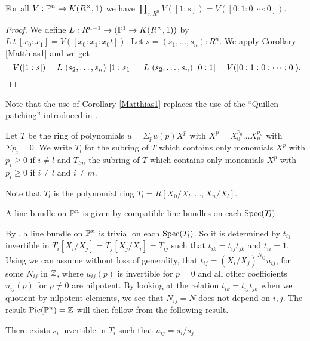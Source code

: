 \begin{proposition}\label{trivial}
  For all $V:\mathbb{P}^n\rightarrow K(R^{\times},1)$ we have ${\prod_{s:R^n}V([1:s]) = V([0:1:0:\cdots :0])}$.
\end{proposition}

\begin{proof}
  We define $L:R^{n-1}\rightarrow (\mathbb{P}^1 \to K(R^{\times},1))$ by $L~t~[x_0:x_1] = V([x_0:x_1:x_0t])$.
  Let $s=(s_1,\dots,s_{n}):R^{n}$. We apply Corollary \ref{Matthias1} and we get
  \[
   V([1:s]) = L~(s_2,\dots,s_n)~[1:s_1] = L~(s_2,\dots,s_n)~[0:1] = V([0:1:0:\cdots :0])
   \rlap{.}
  \]
\end{proof}

 Note that the use of Corollary \ref{Matthias1} replaces the use of the ``Quillen patching''
 \cite{lombardi-quitte} introduced in \cite{Quillen}.

\medskip

Let $T$ be the ring of polynomials $u = \Sigma_p u(p)X^p$ with
$X^p = X_0^{p_0}\dots X_n^{p_n}$ with $\Sigma p_i = 0$. We write $T_l$ for the subring
of $T$ which contains only monomials $X^p$ with $p_i\geqslant 0$ if $i\neq l$
and $T_{lm}$ the subring of $T$ 
which contains only monomials $X^p$ with $p_i\geqslant 0$ if $i\neq l$ and $i\neq m$.

Note that $T_l$ is the polynomial ring $T_l = R[X_0/X_l,\dots,X_n/X_l]$.

A line bundle on $\mathbb{P}^n$ is given by compatible line bundles on each $\operatorname{Spec}(T_l)$.

By , a line bundle on $\mathbb{P}^n$ is trivial on each $\operatorname{Spec}(T_l)$.
So it is determined by $t_{ij}$ invertible in $T_i[X_i/X_j] = T_j[X_j/X_i] = T_{ij}$
such that $t_{ik} = t_{ij}t_{jk}$ and $t_{ii} = 1$. 
Using  we can assume without loss of generality, that
$t_{ij} = (X_i/X_j)^{N_{ij}} u_{ij}$, for some $N_{ij}$ in $\mathbb{Z}$, where $u_{ij}(p)$ is invertible for $p = 0$
and all other coefficients $u_{ij}(p)$ for $p\neq 0$
are nilpotent. By looking at the relation  $t_{ik} = t_{ij}t_{jk}$ when we quotient by nilpotent elements, we see that
$N_{ij} = N$ does not depend on $i,j$.
The result $\mathrm{Pic}(\mathbb{P}^n) = \mathbb{Z}$ will then follow from the following result.

\begin{proposition}
  There exists $s_i$ invertible in $T_i$ such that $u_{ij} = s_i/s_j$ 
\end{proposition}

